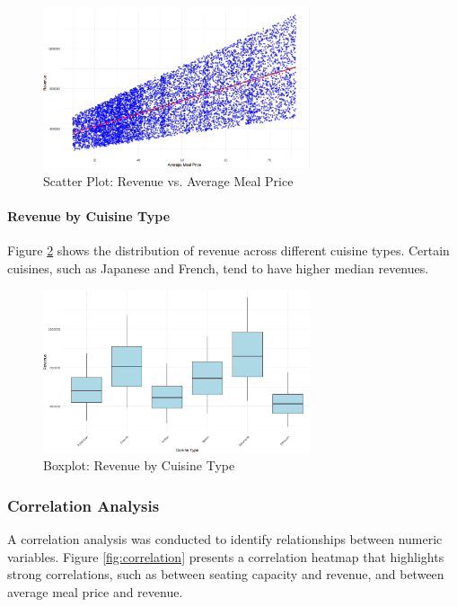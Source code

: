 \begin{figure}[H]
\centering
\includegraphics[width=0.7\textwidth]{img/d1.png}
\caption{Scatter Plot: Revenue vs. Average Meal Price}
\label{fig:revenue_price}
\end{figure}

\paragraph{Revenue by Cuisine Type}
Figure \ref{fig:revenue_cuisine} shows the distribution of revenue across different cuisine types. Certain cuisines, such as Japanese and French, tend to have higher median revenues.

\begin{figure}[H]
\centering
\includegraphics[width=0.7\textwidth]{img/d2.png}
\caption{Boxplot: Revenue by Cuisine Type}
\label{fig:revenue_cuisine}
\end{figure}

\subsubsection{Correlation Analysis}
A correlation analysis was conducted to identify relationships between numeric variables. Figure \ref{fig:correlation} presents a correlation heatmap that highlights strong correlations, such as between seating capacity and revenue, and between average meal price and revenue.

